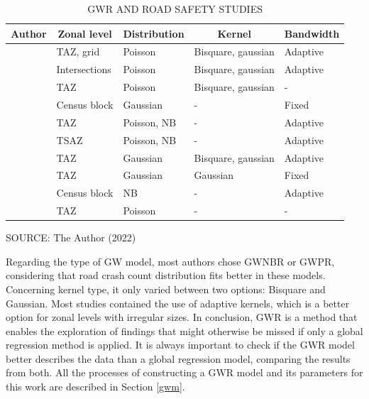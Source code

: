 \begin{table}[!htbp]
    \footnotesize
    \captionsetup{justification=raggedright,
        singlelinecheck=false,
        font=footnotesize}
    \caption{GWR AND ROAD SAFETY STUDIES}
    \centering
    \begin{tabular}{lllp{1.6cm}l}
        \hline
        \multicolumn{1}{c}{\textbf{Author}} & \multicolumn{1}{c}{\textbf{Zonal level}} & \multicolumn{1}{c}{\textbf{Distribution}} & \multicolumn{1}{c}{\textbf{Kernel}} & \multicolumn{1}{c}{\textbf{Bandwidth}} \\
        \hline 
        \textcite{Amoh-Gyimah2017} & TAZ, grid & Poisson & Bisquare, gaussian & Adaptive \\
        \textcite{Arvin2019} & Intersections & Poisson & Bisquare, gaussian & Adaptive \\
        \textcite{Hadayeghi2010} & TAZ & Poisson & Bisquare, gaussian & - \\
        \textcite{Huang2018} & Census block & Gaussian & - & Fixed \\
        \textcite{Obelheiro2019} & TAZ & Poisson, NB & - & Adaptive \\
        \textcite{Obelheiro2020} & TSAZ & Poisson, NB & - & Adaptive \\
        \textcite{Pirdavani2014} & TAZ & Gaussian & Bisquare, gaussian & Adaptive \\
        \textcite{Rhee2016} & TAZ & Gaussian & Gaussian & Fixed \\
        \textcite{Yu2017} & Census block & NB & - & Adaptive \\
        \textcite{Zhang2015} & TAZ & Poisson & - & - \\
        \hline
    \end{tabular}
    \label{tab:gwrworks}
    \par \vspace{2mm} \footnotesize \raggedright
    SOURCE: The Author (2022)
\end{table}

Regarding the type of GW model, most authors chose GWNBR or GWPR, considering that road crash count distribution fits better in these models. Concerning kernel type, it only varied between two options: Bisquare and Gaussian. Most studies contained the use of adaptive kernels, which is a better option for zonal levels with irregular sizes. In conclusion, GWR is a method that enables the exploration of findings that might otherwise be missed if only a global regression method is applied. It is always important to check if the GWR model better describes the data than a global regression model, comparing the results from both. All the processes of constructing a GWR model and its parameters for this work are described in Section \ref{gwm}.

